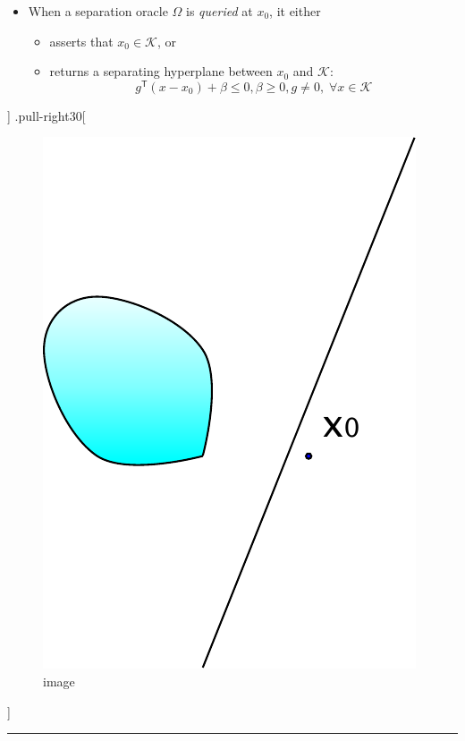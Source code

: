 \documentclass[
]{article}
\providecommand{\tightlist}{%
  \setlength{\itemsep}{0pt}\setlength{\parskip}{0pt}}
\begin{document}
\begin{itemize}
\tightlist
\item
  When a separation oracle \(\Omega\) is \emph{queried} at \(x_0\), it
  either

  \begin{itemize}
  \tightlist
  \item
    asserts that \(x_0 \in \mathcal{K}\), or
  \item
    returns a separating hyperplane between \(x_0\) and \(\mathcal{K}\):
    \[g^\mathsf{T} (x - x_0) + \beta \le 0, \beta \geq 0, g \neq 0, \;
          \forall x \in \mathcal{K}\]
  \end{itemize}
\end{itemize}

{]} .pull-right30{[}

\begin{figure}
\centering
\includegraphics{ellipsoid.files/cut.pdf}
\caption{image}
\end{figure}

{]}

\begin{center}\rule{0.5\linewidth}{0.5pt}\end{center}
\end{document}
